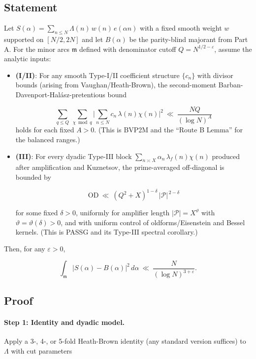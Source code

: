 \documentclass[11pt]{article}
\theoremstyle{definition}
\theoremstyle{remark}
\numberwithin{equation}{part}
\begin{document}
\subsection{Statement}

Let $S(\alpha)=\sum_{n\le N}\Lambda(n)\,w(n)\,e(\alpha n)$ with a fixed smooth weight $w$ supported on $[N/2,2N]$ and let $B(\alpha)$ be the parity-blind majorant from Part A. For the minor arcs $\mathfrak m$ defined with denominator cutoff $Q=N^{1/2-\varepsilon}$, assume the analytic inputs:

\begin{itemize}
	\item \textbf{(I/II)}: For any smooth Type-I/II coefficient structure $\{c_n\}$ with divisor bounds (arising from Vaughan/Heath-Brown), the second-moment Barban-Davenport-Halász-pretentious bound

	      \begin{equation}\label{eq:D1}
		      \sum_{q\le Q}\ \sum_{\chi\bmod q}\Big|\sum_{n\le N} c_n\,\lambda(n)\chi(n)\Big|^2
		      \ \ll\ \frac{NQ}{(\log N)^A}
	      \end{equation}
	      holds for each fixed $A>0$. (This is BVP2M and the “Route B Lemma” for the balanced ranges.)

	\item \textbf{(III)}: For every dyadic Type-III block $\sum_{n\asymp X}\alpha_n\,\lambda_f(n)\chi(n)$ produced after amplification and Kuznetsov, the prime-averaged off-diagonal is bounded by

	      \begin{equation}\label{eq:D2}\mathrm{OD}\ \ll\ (Q^2+X)^{1-\delta}\,|\mathcal P|^{\,2-\delta}\end{equation}

	      for some fixed $\delta>0$, uniformly for amplifier length $|\mathcal P|=X^\vartheta$ with $\vartheta=\vartheta(\delta)>0$, and with uniform control of oldforms/Eisenstein and Bessel kernels. (This is PASSG and its Type-III spectral corollary.)
\end{itemize}

Then, for any $\varepsilon>0$,

$$
	\int_{\mathfrak m}\big|S(\alpha)-B(\alpha)\big|^2\,d\alpha
	\ \ll\ \frac{N}{(\log N)^{3+\varepsilon}}.
$$

\subsection{Proof}

\paragraph{Step 1: Identity and dyadic model.}
Apply a 3-, 4-, or 5-fold Heath-Brown identity (any standard version suffices) to $\Lambda$ with cut parameters
\end{document}
